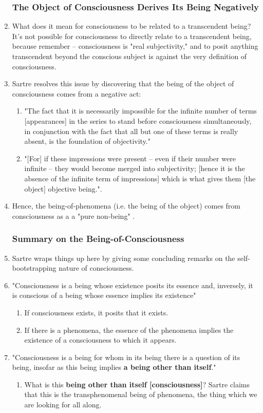 \begin{enumerate}
  \subsubsection{The Object of Consciousness Derives Its Being Negatively}
  \item What does it mean for consciousness to be related to a transcendent being? It's not possible for consciousness to directly relate to a transcendent being, because remember -- consciousness is "real subjectivity," and to posit anything transcendent beyond the conscious subject is against the very definition of consciousness.
  \item Sartre resolves this issue by discovering that the being of the object of consciousness comes from a negative act:
  \begin{enumerate}
    \item "The fact that it is necessarily impossible for the infinite number of terms [appearances] in the series to stand before consciousness simultaneously, in conjunction with the fact that all but one of these terms is really absent, is the foundation of objectivity." \autocite[21]{sartre}
    \item "[For] if these impressions were present -- even if their number were infinite -- they would become merged into subjectivity; [hence it is the absence of the infinite term of impressions] which is what gives them [the object] objective being."\autocite[21]{sartre}.
  \end{enumerate}
  \item Hence, the being-of-phenomena (i.e. the being of the object) comes from consciousness as a a "pure non-being" \autocite[22]{sartre}.

  \subsubsection{Summary on the Being-of-Consciousness}
  \item Sartre wraps things up here by giving some concluding remarks on the self-bootstrapping nature of consciousness.
  \item "Consciousness is a being whose existence posits its essence and, inversely, it is conscious of a being whose essence implies its existence" \autocite[23]{sartre}
  \begin{enumerate}
    \item If consciousness exists, it posits that it exists.
    \item If there is a phenomena, the essence of the phenomena implies the existence of a consciousness to which it appears.
  \end{enumerate}
  \item "Consciousness is a being for whom in its being there is a question of its being, insofar as this being implies \textbf{a being other than itself}." \autocite[23]{sartre}
  \begin{enumerate}
    \item What is this \textbf{being other than itself [consciousness]}? Sartre claims that this is the transphenomenal being of phenomena, the thing which we are looking for all along.
  \end{enumerate}


\end{enumerate}
